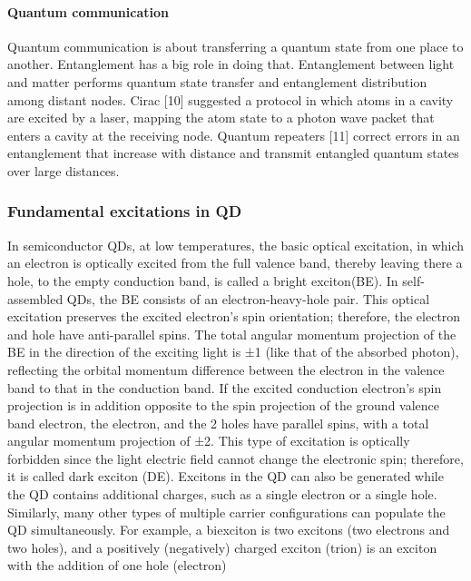 \paragraph{Quantum communication}
Quantum communication is about transferring a quantum state from one place to another. Entanglement has a big role in doing that. Entanglement between light and matter performs quantum state transfer and entanglement distribution among distant nodes.  Cirac [10] suggested a protocol in which atoms in a cavity are excited by a laser, mapping the atom state to a photon wave packet that enters a cavity at the receiving node. Quantum repeaters [11] correct errors in an entanglement that increase with distance and transmit entangled quantum states over large distances.
\subsubsection{Fundamental excitations in QD}
In semiconductor QDs, at low temperatures, the basic optical excitation, in which an electron is optically excited from the full valence band, thereby leaving there a hole, to the empty conduction band, is called a bright exciton(BE). In self-assembled QDs, the BE consists of an electron-heavy-hole pair. This optical excitation preserves the excited electron's spin orientation; therefore, the electron and hole have anti-parallel spins. The total angular momentum projection of the BE in the direction of the exciting light is ±1 (like that of the absorbed photon), reflecting the orbital momentum difference between the electron in the valence band to that in the conduction band.
If the excited conduction electron's spin projection is in addition opposite to the spin projection of the ground valence band electron, the electron, and the 2 holes have parallel spins, with a total angular momentum projection of ±2. This type of excitation is optically forbidden since the light electric field cannot change the electronic spin; therefore, it is called dark exciton (DE). Excitons in the QD can also be generated while the QD contains additional charges, such as a single electron or a single hole. Similarly, many other types of multiple carrier configurations can populate the QD simultaneously. For example, a biexciton is two excitons (two electrons and two holes), and a positively (negatively) charged exciton (trion) is an exciton with the addition of one hole (electron) 
